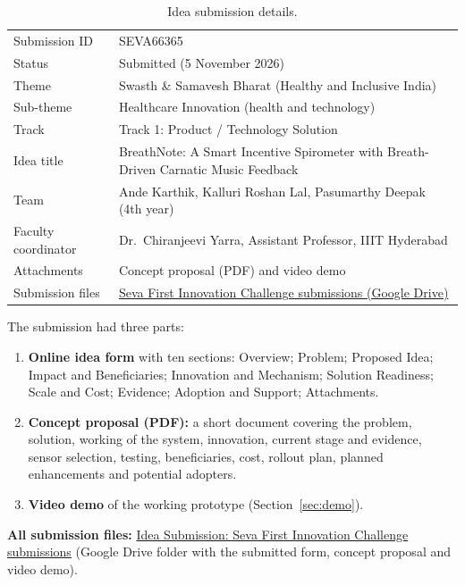 \documentclass[12pt,a4paper]{article}
\newcommand{\sevaurl}{https://drive.google.com/drive/folders/1aHvxULoR30UtWy43ls5HY10PJA5bWtyK?usp=sharing}
\begin{document}
\begin{table}[H]
\centering
\caption{Idea submission details.}
\label{tab:submission}
\small
\begin{tabularx}{\linewidth}{@{}P{3.6cm} L@{}}
\toprule
Submission ID      & SEVA66365 \\
Status             & Submitted (5 November 2026) \\
Theme              & Swasth \& Samavesh Bharat (Healthy and Inclusive India) \\
Sub-theme          & Healthcare Innovation (health and technology) \\
Track              & Track 1: Product / Technology Solution \\
Idea title         & BreathNote: A Smart Incentive Spirometer with Breath-Driven Carnatic Music Feedback \\
Team               & Ande Karthik, Kalluri Roshan Lal, Pasumarthy Deepak (4th year) \\
Faculty coordinator& Dr.\ Chiranjeevi Yarra, Assistant Professor, IIIT Hyderabad \\
Attachments        & Concept proposal (PDF) and video demo \\
Submission files   & \href{\sevaurl}{Seva First Innovation Challenge submissions (Google Drive)} \\
\bottomrule
\end{tabularx}
\end{table}

The submission had three parts:
\begin{enumerate}
  \item \textbf{Online idea form} with ten sections: Overview; Problem; Proposed Idea; Impact and Beneficiaries; Innovation and Mechanism; Solution Readiness; Scale and Cost; Evidence; Adoption and Support; Attachments.
  \item \textbf{Concept proposal (PDF):} a short document covering the problem, solution, working of the system, innovation, current stage and evidence, sensor selection, testing, beneficiaries, cost, rollout plan, planned enhancements and potential adopters.
  \item \textbf{Video demo} of the working prototype (Section~\ref{sec:demo}).
\end{enumerate}

\textbf{All submission files:} \href{\sevaurl}{Idea Submission: Seva First Innovation Challenge submissions} (Google Drive folder with the submitted form, concept proposal and video demo).
\end{document}
